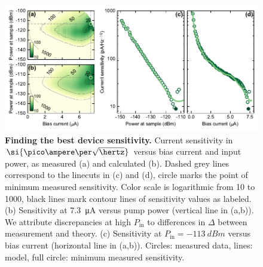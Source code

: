 \begin{figure}
	\centering
	\includegraphics[width=\linewidth]{chapter-currentdetection/figures/Figure4}
	\caption{
		\textbf{Finding the best device sensitivity.}
		Current sensitivity in $\si{\pico\ampere\per\sqrt{\hertz}}$ versus bias current and input power, as measured (a) and calculated (b).
		Dashed grey lines correspond to the linecuts in (c) and (d), circle marks the point of minimum measured sensitivity.
		Color scale is logarithmic from 10 to 1000, black lines mark contour lines of sensitivity values as labeled.
		(b) Sensitivity at \SI{7.3}{\micro\ampere} versus pump power (vertical line in (a,b)).
		We attribute discrepancies at high $P_\text{in}$ to differences in $\Delta$ between measurement and theory.
		(c) Sensitivity at $P_\text{in}=\SI{-113}{dBm}$ versus bias current (horizontal line in (a,b)).
		Circles: measured data, lines: model, full circle: minimum measured sensitivity.
		\label{fig:figure4}
	}
\end{figure}

